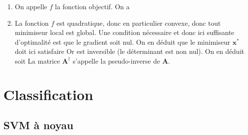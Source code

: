 \documentclass{article}
\begin{document}
\begin{enumerate}
	\item On appelle $f$ la fonction objectif. On a
	
	\item La fonction $f$ est quadratique, donc en particulier convexe, donc tout minimiseur local est global. Une condition nécessaire et donc ici suffisante d'optimalité est que le gradient soit nul. On en déduit que le minimiseur $\mathbf{x}^*$ doit ici satisfaire
	Or
	est inversible (le déterminant est non nul). On en déduit
	soit
	La matrice $\mathbf{A}^\dagger$ s'appelle la pseudo-inverse de $\mathbf{A}$.
\end{enumerate} 

\section{Classification}
\subsection{SVM à noyau}
\end{document}
